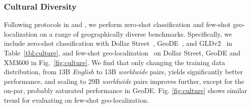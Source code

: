 \begin{table}[h]
\centering
{}
\vspace{1.5mm}
\caption{Ablation study of various multilingual tokenizers with ViT-B/32 and Worldwide 1.0$\times$.}
\label{tbl:tokenizer_ablation}
\end{table}
\vspace{-3.mm}

\subsubsection{Cultural Diversity}
\label{sec:cultural}

Following protocols in \cite{pouget2024no} and \cite{wang2025scaling}, we perform zero-shot classification and few-shot geo-localization on a range of geographically diverse benchmarks. Specifically, we include zero-shot classification with Dollar Street~\citep{gaviria2022dollar}, GeoDE~\citep{ramaswamy2023geode}, and GLDv2~\citep{weyand2020google} in Table~\ref{tbl:culture}, and few-shot geo-localization~\citep{pouget2024no} on Dollar Street, GeoDE and XM3600 
in Fig.~\ref{fig:culture}. We find that only changing the training data distribution, from 13B \emph{English} to 13B \emph{worldwide} pairs, yields significantly better performance, and scaling to 29B \emph{worldwide} pairs improves further,
except for the on-par, probably saturated performance in GeoDE. Fig. \ref{fig:culture} shows similar trend for evaluating on few-shot geo-localization.
\vspace{-2.mm}

